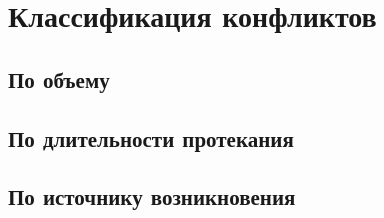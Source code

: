\chapter{Классификация конфликтов}

\section{По объему}

\section{По длительности протекания}

\section{По источнику возникновения}

